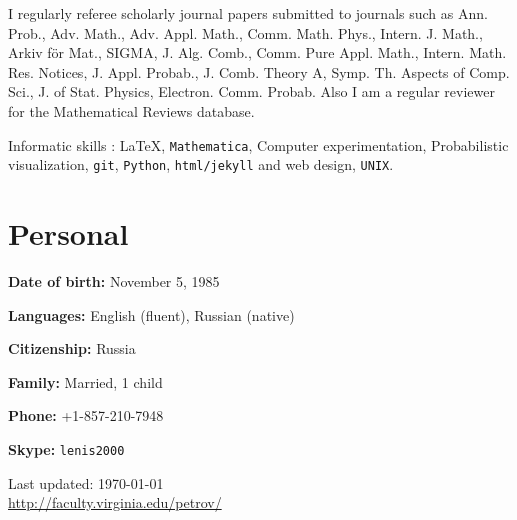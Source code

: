 \documentclass[letterpaper,11pt]{article}
\def\footerlink{http://faculty.virginia.edu/petrov/}
\begin{document}


\medskip

I regularly referee scholarly journal papers
submitted to journals such as
Ann. Prob.,
Adv. Math.,
Adv. Appl. Math.,
Comm. Math. Phys.,
Intern. J. Math.,
Arkiv f\"or Mat.,
SIGMA,
J. Alg. Comb.,
Comm. Pure Appl. Math.,
Intern. Math. Res. Notices,
J. Appl. Probab.,
J. Comb. Theory A,
Symp. Th. Aspects of Comp. Sci.,
J. of Stat. Physics,
Electron. Comm. Probab.
Also I am a regular reviewer for the
Mathematical Reviews database.






\medskip

Informatic skills :
\LaTeX,
\texttt{Mathematica},
Computer experimentation,
Probabilistic visualization,
\texttt{git},
\texttt{Python},
\texttt{html/jekyll} and web design, \texttt{UNIX}.

\section*{Personal}

\textbf{Date of birth:} November 5, 1985

\textbf{Languages:} English (fluent), Russian (native)

\textbf{Citizenship:} Russia

\textbf{Family:} Married, 1 child

\textbf{Phone:} +1-857-210-7948

\textbf{Skype:} \texttt{lenis2000}

\bigskip

\begin{center}
	\begin{footnotesize}
		Last updated: \today \\
		\href{\footerlink}{\url{\footerlink}}
	\end{footnotesize}
\end{center}
\end{document}
